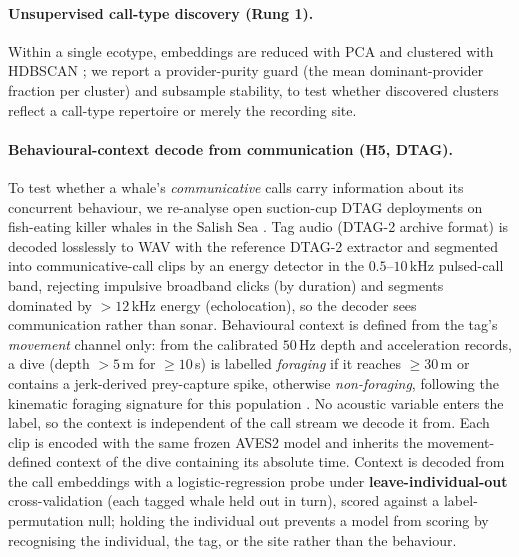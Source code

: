 \documentclass[11pt]{article}
\begin{document}
\paragraph{Unsupervised call-type discovery (Rung 1).} Within a single ecotype, embeddings
are reduced with PCA and clustered with HDBSCAN \citep{mcinnes2017hdbscan}; we report a
provider-purity guard (the mean dominant-provider fraction per cluster) and subsample
stability, to test whether discovered clusters reflect a call-type repertoire
\citep{ford1989,filatova2015} or merely the recording site.

\paragraph{Behavioural-context decode from communication (H5, DTAG).} To test whether a
whale's \emph{communicative} calls carry information about its concurrent behaviour, we
re-analyse open suction-cup DTAG deployments on fish-eating killer whales in the Salish Sea
\citep{holt2024masking_data,tennessen2019,holt2024masking}. Tag audio (DTAG-2 archive format)
is decoded losslessly to WAV with the reference DTAG-2 extractor and segmented into
communicative-call clips by an energy detector in the $0.5$--$10$\,kHz pulsed-call band,
rejecting impulsive broadband clicks (by duration) and segments dominated by $>\!12$\,kHz
energy (echolocation), so the decoder sees communication rather than sonar. Behavioural
context is defined from the tag's \emph{movement} channel only: from the calibrated $50$\,Hz
depth and acceleration records, a dive (depth $>5$\,m for $\geq 10$\,s) is labelled
\emph{foraging} if it reaches $\geq 30$\,m or contains a jerk-derived prey-capture spike,
otherwise \emph{non-foraging}, following the kinematic foraging signature for this population
\citep{tennessen2019,holt2024masking}. No acoustic variable enters the label, so the context
is independent of the call stream we decode it from. Each clip is encoded with the same
frozen AVES2 model and inherits the movement-defined context of the dive containing its
absolute time. Context is decoded from the call embeddings with a logistic-regression probe
under \textbf{leave-individual-out} cross-validation (each tagged whale held out in turn),
scored against a label-permutation null; holding the individual out prevents a model from
scoring by recognising the individual, the tag, or the site rather than the behaviour.
\end{document}
